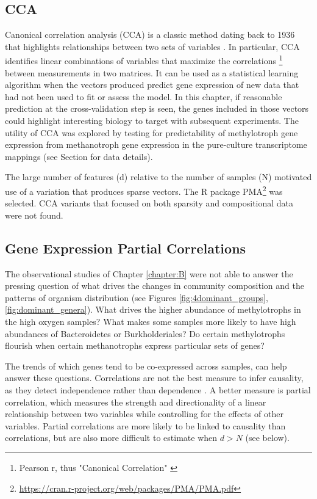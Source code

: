 \subsection{CCA}
Canonical correlation analysis (CCA) is a classic method dating back to 1936 \cite{hotelling1936} that highlights relationships between two sets of variables \cite{sherry2005}.
In particular, CCA identifies linear combinations of variables that maximize the correlations \footnote{Pearson r, thus "Canonical Correlation" \cite{sherry2005}} between measurements in two matrices.
It can be used as a statistical learning algorithm when the vectors produced predict gene expression of new data that had not been used to fit or assess the model.
In this chapter, if reasonable prediction at the cross-validation step is seen, the genes included in those vectors could highlight interesting biology to target with subsequent experiments.
The utility of CCA was explored by testing for predictability of methylotroph gene expression from methanotroph gene expression in the pure-culture transcriptome mappings (see Section for data details).

The large number of features (d) relative to the number of samples (N) motivated use of a variation that produces sparse vectors.
The R package PMA\footnote{\url{https://cran.r-project.org/web/packages/PMA/PMA.pdf}} \cite{witten2009} was selected.
CCA variants that focused on both sparsity and compositional data were not found.

\subsection{Gene Expression Partial Correlations}

The observational studies of Chapter \ref{chapter:B} were not able to answer the pressing question of what drives the changes in community composition and the patterns of organism distribution (see Figures \ref{fig:4dominant_groups}, \ref{fig:dominant_genera}).
What drives the higher abundance of methylotrophs in the high oxygen samples? %
What makes some samples more likely to have high abundances of Bacteroidetes or Burkholderiales?
Do certain methylotrophs flourish when certain methanotrophs express particular sets of genes?

The trends of which genes tend to be co-expressed across samples, can help answer these questions.
Correlations are not the best measure to infer causality, as they detect independence rather than dependence \cite{schafer2005}.
A better measure is partial correlation, which measures the strength and directionality of a linear relationship between two variables while controlling for the effects of other variables.
Partial correlations are more likely to be linked to causality than correlations, but are also more difficult to estimate when $d > N$ (see below). %

